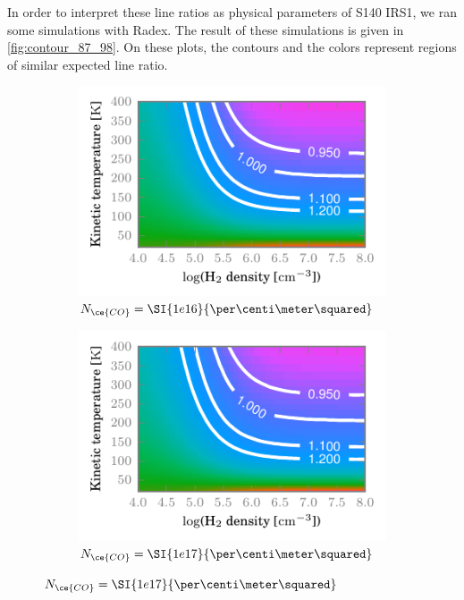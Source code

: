 In order to interpret these line ratios as physical parameters of S140 IRS1, we ran some simulations with Radex.
The result of these simulations is given in \cref{fig:contour_87_98}.
On these plots, the contours and the colors represent regions of similar expected line ratio.

\begin{figure}
    \centering
    \begin{subfigure}[b]{0.5\textwidth}
        \includegraphics[width=\textwidth]{contour_87_98_e16}
        \caption{$N_\ce{CO} = \SI{1e16}{\per\centi\meter\squared}$}
    \end{subfigure}%
    \hfill
    \begin{subfigure}[b]{0.5\textwidth}
        \includegraphics[width=\textwidth]{contour_87_98_e17}
        \caption{$N_\ce{CO} = \SI{1e17}{\per\centi\meter\squared}$}

\end{subfigure}
\end{figure}
